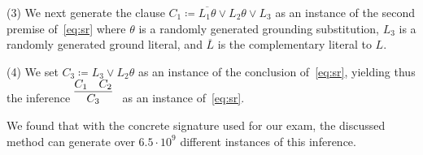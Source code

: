 
\noindent (3)  We next generate the clause
$C_1 \coloneqq \overline{L_1\theta} \lor L_2\theta \lor L_3$
as an instance of the second premise of~\eqref{eq:sr}
where $\theta$ is a randomly generated grounding substitution,
$L_3$ is a randomly generated ground literal,
and
$\overline{L}$ is the complementary%
literal to $L$.\smallskip

\noindent (4)
We set $C_3 \coloneqq L_3 \lor L_2\theta$ as an instance of the
conclusion of~\eqref{eq:sr}, yielding thus the inference $\infer[]{
      C_3
      }{
      C_1
      &
      {C_2}}$ as an instance of~\eqref{eq:sr}.\smallskip

 




We found that with the concrete signature used for our exam,
the discussed method can generate over $6.5 \cdot 10^9$ different instances
of this inference.

